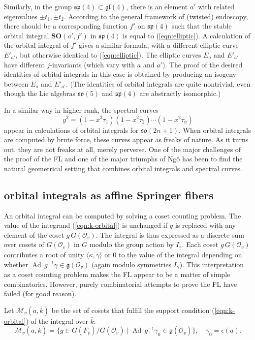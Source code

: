 \documentclass[brochure,english,12pt]{bourbaki}
\theoremstyle{plain}
\def\op#1{{\operatorname{#1}}}
\def\SO{{\mathbf {SO}}}
\def\so{\mathfrak{so}}
\def\sp{\mathfrak{sp}}
\def\gl{\mathfrak{gl}}
\def\g{\mathfrak{g}}
\def\M{{\mathcal M}}
\def\O{{\mathcal O}}
\begin{document}
Similarly, in the group $\sp(4)\subset\gl(4)$, there is an element
${{a'}}$ with related eigenvalues $\pm t_1,\pm t_2$.  According to the
general framework of (twisted) endoscopy, there should be a
corresponding function $f'$ on $\sp(4)$ such that the stable orbital
integral $\SO(a',f')$ in $\sp(4)$ is equal to (\ref{eqn:elliptic}).  A
calculation of the orbital integral of $f'$ gives a similar formula,
with a different elliptic curve $E'_{{a'}}$, but otherwise identical
to (\ref{eqn:elliptic}).  The elliptic curves $E_a$ and $E'_{{a'}}$
have different $j$-invariants (which vary with $a$ and ${{a'}}$).  The
proof of the desired identities of orbital integrals in this case is
obtained by producing an isogeny between $E_a$ and $E'_{{a'}}$.  (The
 identities of orbital
integrals are quite nontrivial, even though the Lie algebras $\so(5)$
and $\sp(4)$ are abstractly isomorphic.)

In a similar way in higher rank,  the spectral curves
\[
y^2 = (1-x^2 \tau_1)(1-x^2 \tau_2)\cdots (1-x^2 \tau_n)
\]
appear  in calculations of orbital integrals for
$\so(2n+1)$.  When orbital integrals are computed by brute force,
these curves appear as freaks of nature.  As it turns
out, they are not freaks at all, merely perverse.  One of the major
challenges of the proof of the FL and one of the major
triumphs of Ng\^o has been to find the natural geometrical setting that combines
orbital integrals and spectral curves.


\subsection{orbital integrals as affine Springer fibers}\label{sec:coset}

An orbital integral can be computed by solving a coset counting
problem.  The value of the integrand (\ref{eqn:k-orbital}) is
unchanged if $g$ is replaced with any element of the coset
$g\,G(\O_v)$.  The integral is thus expressed as a discrete sum over
cosets of $G(\O_v)$ in $G$ modulo the group action by $I_\gamma$.
Each coset $g\, G(\O_v)$ contributes a root of unity
$\langle\kappa,\gamma\rangle$ or $0$ to the value of the integral
depending on whether $\op{Ad}\,g^{-1}\gamma \in \g(\O_v)$ (again
modulo symmetries $I_\gamma$).  This interpretation as a coset
counting problem makes the FL appear to be a matter of simple
combinatorics.  However, purely combinatorial attempts to prove the FL
have failed (for good reason).

Let $\M_v(a,\bar k)$ be the set of cosets that fulfill the support
condition (\ref{eqn:k-orbital}) of the integral over $\bar k$:
\[
\M_v(a,\bar k) = \{g\in G(\bar F_v)/G(\bar \O_v) 
\mid \op{Ad}\,g^{-1} \gamma_0 \in \g(\bar\O_v)\}, 
\quad \gamma_0 = \epsilon(a).
\]
\end{document}
